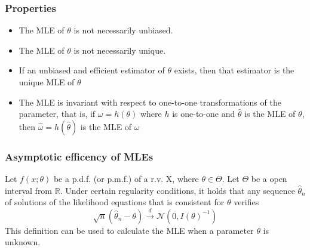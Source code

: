 
\subsubsection{Properties}
\begin{itemize}
    \item The MLE of $\theta$ is not necessarily unbiased.
    \item The MLE of $\theta$ is not necessarily unique.
    \item If an unbiased and efficient estimator of $\theta$ exists, then that
    estimator is the unique MLE of $\theta$
    \item The MLE is invariant with respect to one-to-one transformations of the
    parameter, that is, if $\omega=h(\theta)$ where $h$ is one-to-one and
    $\hat{\theta}$ is the MLE of $\theta$, then $\hat{\omega}=h(\hat{\theta})$
    is the MLE of $\omega$
\end{itemize}

\subsubsection{Asymptotic efficency of MLEs}
Let $f(x;\theta)$ be a p.d.f. (or p.m.f.) of a r.v. X, where $\theta\in\Theta$.
Let $\Theta$ be a open interval from $\mathbb{R}$. Under certain regularity
conditions, it holds that any sequence
$\hat{\theta}_n$ of solutions of the likelihood equations that is consistent for
$\theta$ verifies
\[ \sqrt{n}(\hat{\theta}_n-\theta) \xrightarrow{d} \mathcal{N}(0,
I(\theta)^{-1}) \] This definition can be used to calculate the MLE when a
parameter $\theta$ is unknown.

